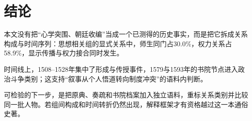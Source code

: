 \section{结论}

本文没有把“心学突围、朝廷收编”当成一个已测得的历史事实，而是把它拆成关系构成与时间序列：思想相关组的显式关系中，师生同门占30.0\%，权力关系占58.9\%，显示传播与权力接合同时发生。

时间线上，1508--1528年集中了形成与传授事件，1579与1593年的书院节点进入政治斗争类别；这支持“叙事从个人悟道转向制度冲突”的语料内判断。

可检验的下一步，是把原典、奏疏和书院档案加入独立语料，重标关系类别并比较同一批人物。若组间构成和时间转折仍然出现，解释框架才有资格越过这一本通俗史著。
